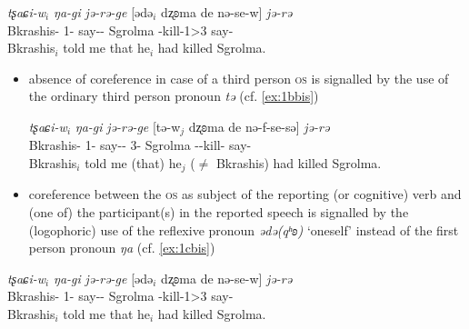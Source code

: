\documentclass[11pt]{article}
\newcommand{\ipa}[1]{{\textit{\phon #1}}} %
\newcommand{\ipapl}[1]{{\phondroit #1}}
\begin{document}
\begin{exe}
\ex \label{ex:1c}
\gll
	\ipa{tʂaɕi-w}$_i$ \ipa{ŋa-gi}	\ipa{jə-rə-ge} [\ipapl{ədə}$_i$	\ipapl{dʐʚma} 	\ipapl{de} 	\ipapl{nə-se-w}] \ipa{jə-rə}  \\
	{Bkrashis-\erg} {1\sg-\dat} {say-\const-\conv} {} Sgrolma {\dem} {\prf-kill-1\sg>3} say-\const\\ 
	\glt Bkrashis$_i$ told me that he$_i$ had killed Sgrolma.
\end{exe}



\begin{itemize}

 \item absence of coreference in case of a third person \textsc{os} is signalled by the use of the ordinary third person pronoun \ipa{tə} (cf. \ref{ex:1bbis})

\begin{exe}
\ex \label{ex:1bbis}
\gll
	\ipa{tʂaɕi-w}$_i$ \ipa{ŋa-gi}	\ipa{jə-rə-ge} [\ipapl{tə-w}$_j$	\ipapl{dʐʚma} 	\ipapl{de} \ipapl{nə-f-se-sə}] \ipa{jə-rə}  \\
	{Bkrashis-\erg} {1\sg-\dat} {say-\const-\conv} {3\sg-\erg} Sgrolma {\dem} {\prf-\inv-kill-\evid}  say-\const\\ 
	\glt Bkrashis$_i$ told me (that) he$_j$ ($\ne$ Bkrashis) had killed Sgrolma.
\end{exe}

\end{itemize}


\begin{itemize}
 \item coreference between the \textsc{os} as subject of the reporting (or cognitive) verb and (one of) the participant(s) in the reported speech is signalled by the (logophoric) use of the reflexive pronoun \ipa{ədə(qʰʚ)} `oneself' instead of the first person pronoun \ipa{ŋa} (cf. \ref{ex:1cbis})
\end{itemize}


\begin{exe}
\ex \label{ex:1cbis}
\gll
	\ipa{tʂaɕi-w}$_i$ \ipa{ŋa-gi}	\ipa{jə-rə-ge} [\ipapl{ədə}$_i$	\ipapl{dʐʚma} 	\ipapl{de} 	\ipapl{nə-se-w}] \ipa{jə-rə}  \\
	{Bkrashis-\erg} {1\sg-\dat} {say-\const-\conv} {} Sgrolma {\dem} {\prf-kill-1\sg>3} say-\const\\ 
	\glt Bkrashis$_i$ told me that he$_i$ had killed Sgrolma.
\end{exe}
\end{document}
